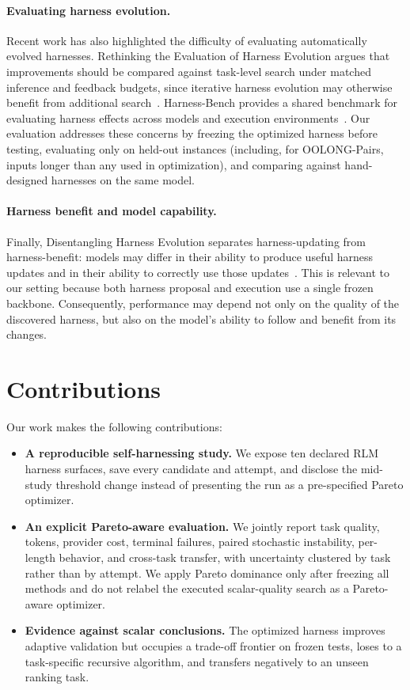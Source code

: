 \documentclass[letterpaper]{article} %
\newcommand{\rlm}{\textsc{RLM}\xspace}
\begin{document}
\paragraph{Evaluating harness evolution.}
Recent work has also highlighted the difficulty of evaluating automatically evolved harnesses. Rethinking the Evaluation of Harness Evolution argues that improvements should be compared against task-level search under matched inference and feedback budgets, since iterative harness evolution may otherwise benefit from additional search~\citep{wang2026rethinkeval}. Harness-Bench provides a shared benchmark for evaluating harness effects across models and execution environments~\citep{yao2026harnessbench}. Our evaluation addresses these concerns by freezing the optimized harness before testing, evaluating only on held-out instances (including, for OOLONG-Pairs, inputs longer than any used in optimization), and comparing against hand-designed harnesses on the same model.

\paragraph{Harness benefit and model capability.}
Finally, Disentangling Harness Evolution separates harness-updating from harness-benefit: models may differ in their ability to produce useful harness updates and in their ability to correctly use those updates~\citep{lin2026disentangling}. This is relevant to our setting because both harness proposal and execution use a single frozen backbone. Consequently, performance may depend not only on the quality of the discovered harness, but also on the model's ability to follow and benefit from its changes.

\section{Contributions}

Our work makes the following contributions:

\begin{itemize}
    \item \textbf{A reproducible self-harnessing study.}
    We expose ten declared \rlm{} harness surfaces, save every candidate and
    attempt, and disclose the mid-study threshold change instead of presenting
    the run as a pre-specified Pareto optimizer.

    \item \textbf{An explicit Pareto-aware evaluation.}
    We jointly report task quality, tokens, provider cost, terminal failures,
    paired stochastic instability, per-length behavior, and cross-task transfer,
    with uncertainty clustered by task rather than by attempt. We apply Pareto
    dominance only after freezing all methods and do not relabel the executed
    scalar-quality search as a Pareto-aware optimizer.

    \item \textbf{Evidence against scalar conclusions.}
    The optimized harness improves adaptive validation but occupies a trade-off
    frontier on frozen tests, loses to a task-specific recursive algorithm, and
    transfers negatively to an unseen ranking task.
\end{itemize}
\end{document}
